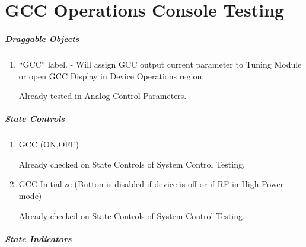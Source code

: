 \documentclass[11pt]{book}		%
\begin{document}
\chapter{GCC Operations Console Testing}

\paragraph{Draggable Objects}

\begin{enumerate}
 \item ``GCC'' label. - Will assign GCC output current parameter to Tuning Module or open GCC Display in Device Operations region.

\color{red}
Already tested in Analog Control Parameters.
\color{black}

\end{enumerate}

\paragraph{State Controls}

\begin{enumerate}
 \item GCC (ON,OFF)

\color{red}
Already checked on State Controls of System Control Testing.
\color{black}

 \item GCC Initialize (Button is disabled if device is off or if RF in High Power mode)

\color{red}
Already checked on State Controls of System Control Testing.
\color{black}

\end{enumerate}

\paragraph{State Indicators}
\end{document}

